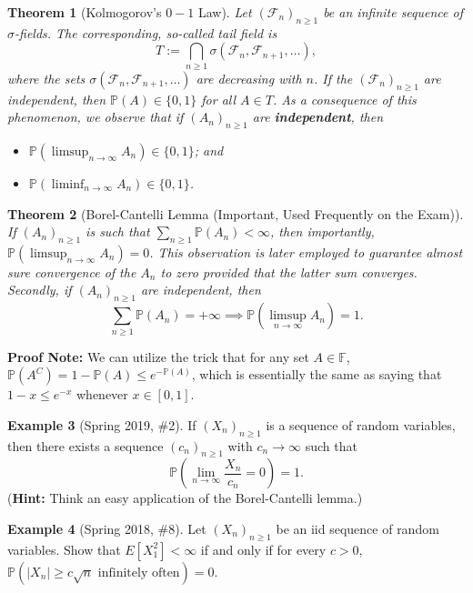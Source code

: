 \documentclass[12pt,reqno]{article}
\renewcommand{\emph}[1]{\textit{#1}}
\theoremstyle{plain}
\newtheorem{theorem}{Theorem}[section]
\theoremstyle{definition}
\newtheorem{example}[theorem]{Example}
\newcommand{\PP}[1]{\ensuremath{\mathbb{P}\left(#1\right)}}
\begin{document}
\begin{theorem}[Kolmogorov's $0-1$ Law] 
Let $(\mathcal{F}_n)_{n \geq 1}$ be an infinite sequence of $\sigma$-fields. The corresponding, 
so-called \emph{tail field} is 
\[
T := \bigcap_{n \geq 1} \sigma(\mathcal{F}_n, \mathcal{F}_{n+1}, \ldots), 
\]
where the sets $\sigma(\mathcal{F}_n, \mathcal{F}_{n+1}, \ldots)$ are decreasing with $n$. 
If the $(\mathcal{F}_n)_{n \geq 1}$ are independent, then $\PP{A} \in \{0,1\}$ for all 
$A \in T$. 
As a consequence of this phenomenon, we observe that if $(A_n)_{n \geq 1}$ are \textbf{independent}, then 
\begin{itemize} 

\item[(1)] $\PP{\limsup_{n \rightarrow \infty} A_n} \in \{0,1\}$; and 
\item[(2)] $\PP{\liminf_{n \rightarrow \infty} A_n} \in \{0,1\}$. 

\end{itemize} 
\end{theorem} 

\begin{theorem}[Borel-Cantelli Lemma (Important, Used Frequently on the Exam)] 
If $(A_n)_{n \geq 1}$ is such that $\sum_{n \geq 1} \PP{A_n} < \infty$, then 
importantly, $\PP{\limsup_{n \rightarrow \infty} A_n} = 0$. This observation 
is later employed to guarantee almost sure convergence of the $A_n$ to zero 
provided that the latter sum converges. Secondly, if $(A_n)_{n \geq 1}$ are 
independent, then 
\[
\sum_{n \geq 1} \PP{A_n} = +\infty \implies \PP{\limsup_{n \rightarrow \infty} A_n} = 1. 
\]
\end{theorem} 

\noindent 
\textbf{Proof Note:} We can utilize the trick that for any set $A \in \mathbb{F}$, 
$\PP{A^C} = 1 - \PP{A} \leq e^{-\PP{A}}$, which is essentially the same as 
saying that $1-x \leq e^{-x}$ whenever $x \in [0, 1]$. 

\begin{example}[Spring 2019, \#2]
If $(X_n)_{n \geq 1}$ is a sequence of random variables, then there exists a 
sequence $(c_n)_{n \geq 1}$ with $c_n \rightarrow \infty$ such that 
\[
\PP{\lim_{n \rightarrow \infty} \frac{X_n}{c_n} = 0} = 1. 
\]
(\textbf{Hint: } Think an easy application of the Borel-Cantelli lemma.) 
\end{example} 

\begin{example}[Spring 2018, \#8]
Let $(X_n)_{n \geq 1}$ be an iid sequence of random variables. Show that 
$E[X_1^2] < \infty$ if and only if for every $c > 0$, 
$\PP{|X_n| \geq c\sqrt{n} \text{ infinitely often}} = 0$. 
\end{example} 
\end{document}
